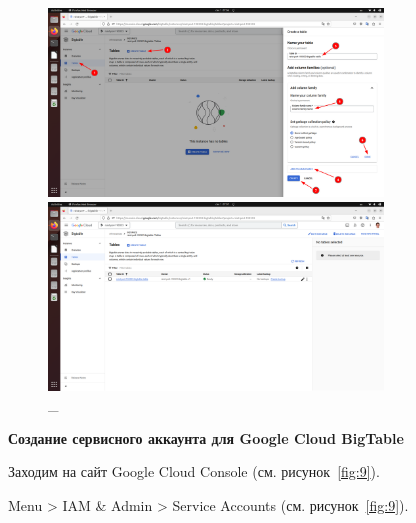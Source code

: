 \documentclass[12pt, a4paper, simple]{eskdtext}
\begin{document}
  \begin{figure}[!h]
    \centering
  
    \begin{minipage}{0.49\textwidth}
      \centering
  
      \includegraphics[height=5cm]
      {images/GoogleCloudBigTable/2023-03-01_07-07-28.png}
  
      \caption{\_}
  
      \label{fig:7}
    \end{minipage}
    \begin{minipage}{0.49\textwidth}
      \centering
  
      \includegraphics[height=5cm]
      {images/GoogleCloudBigTable/2023-03-01_07-07-46.png}
  
      \caption{\_}
  
      \label{fig:8}
    \end{minipage}
  \end{figure}

  \newpage
  \begin{center}
    \textbf{Создание сервисного аккаунта для Google Cloud BigTable}
  \end{center}

  Заходим на сайт Google Cloud Console \cite{GoogleCloudConsole} (см. рисунок~\ref{fig:9}).

  Menu > IAM \& Admin > Service Accounts \cite{GoogleCloudServiceAccounts} (см. рисунок~\ref{fig:9}).
\end{document}
